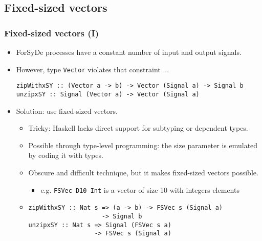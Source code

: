 \documentclass{beamer}
\begin{document}
\subsection{Fixed-sized vectors}
\begin{frame}[fragile]
  \frametitle{Fixed-sized vectors (I)}
\begin{itemize}
\item ForSyDe processes have a constant number of input and output
  signals.
  \pause
\item However, type \texttt{Vector}  violates that constraint ...

\begin{lstlisting}
zipWithxSY :: (Vector a -> b) -> Vector (Signal a) -> Signal b
unzipxSY :: Signal (Vector a) -> Vector (Signal a)
\end{lstlisting}
  \pause
\item Solution: use fixed-sized vectors.
  \begin{itemize}
  \item Tricky: Haskell lacks direct support for subtyping or dependent 
    types.
    \pause
  \item Possible through type-level programming: the size parameter
    is emulated by coding it with types.
  \item Obscure and difficult technique, but it makes fixed-sized vectors
    possible.
    \begin{itemize}
    \item e.g. \texttt{FSVec D10 Int} is a vector of size 10 with integers
      elements
    \end{itemize}

\pause
\item
\begin{lstlisting}
zipWithxSY :: Nat s => (a -> b) -> FSVec s (Signal a) 
                    -> Signal b
unzipxSY :: Nat s => Signal (FSVec s a) 
                  -> FSVec s (Signal a)
\end{lstlisting}
\end{itemize}
\end{itemize}
\end{frame}
\end{document}
